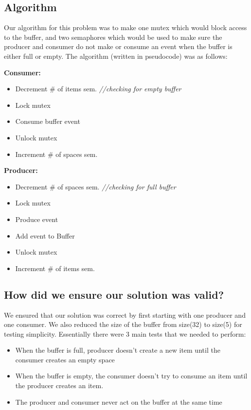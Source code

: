 \documentclass{article}
\begin{document}
\subsection{Algorithm}

Our algorithm for this problem was to make one mutex which would block access to the buffer, and two semaphores which would be used to make sure the producer and consumer do not make or consume an event when the buffer is either full or empty. The algorithm (written in pseudocode) was as follows: 


\textbf{Consumer:}
\begin{itemize}
\item Decrement \# of items sem. \textit{//checking for empty buffer}
\item Lock mutex
\item Consume buffer event
\item Unlock mutex
\item Increment \# of spaces sem.
\end{itemize}


\textbf{Producer:}
\begin{itemize}
\item Decrement \# of spaces sem. \textit{//checking for full buffer}
\item Lock mutex
\item Produce event
\item Add event to Buffer
\item Unlock mutex
\item Increment \# of items sem.
\end{itemize}

\subsection{How did we ensure our solution was valid?}
We ensured that our solution was correct by first starting with one producer and one consumer. We also reduced the size of the buffer from size(32) to size(5) for testing simplicity. Essentially there were 3 main tests that we needed to perform:
\begin{itemize}
\item When the buffer is full, producer doesn’t create a new item until the consumer creates an empty space
\item When the buffer is empty, the consumer doesn’t try to consume an item until the producer creates an item.
\item The producer and consumer never act on the buffer at the same time
\end{itemize}
\end{document}

